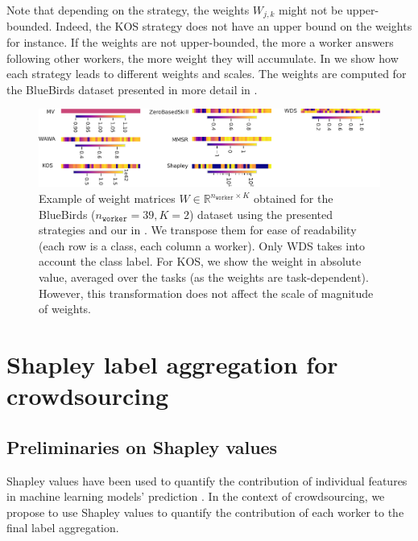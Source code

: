 \documentclass{cap2024}
\begin{document}
Note that depending on the strategy, the weights $W_{j,k}$ might not be upper-bounded.
Indeed, the KOS strategy does not have an upper bound on the weights for instance.
If the weights are not upper-bounded, the more a worker answers following other workers, the more weight they will accumulate.
In  we show how each strategy leads to different weights and scales.
The weights are computed for the BlueBirds dataset \citep{WelinderEtal10b} presented in more detail in .

\begin{figure}[htbp]
  \centering
  \includegraphics[width=\textwidth]{../matrix_weights_bluebirds.pdf}
  \caption{Example of weight matrices $W\in\mathbb{R}^{n_\texttt{worker}\times K}$ obtained for the BlueBirds ($n_\texttt{worker}=39, K=2$) dataset using the presented strategies and our in . We transpose them for ease of readability (each row is a class, each column a worker). Only WDS takes into account the class label. For KOS, we show the weight in absolute value, averaged over the tasks (as the weights are task-dependent). However, this transformation does not affect the scale of magnitude of weights.}
  \label{fig:weights_by_strat}
\end{figure}

\section{Shapley label aggregation for crowdsourcing}
\label{sec:shapagg}

\subsection{Preliminaries on Shapley values}

Shapley values have been used to quantify the contribution of individual features in machine learning models' prediction \citep{molnar2020interpretable}.
In the context of crowdsourcing, we propose to use Shapley values to quantify the contribution of each worker to the final label aggregation.
\end{document}
